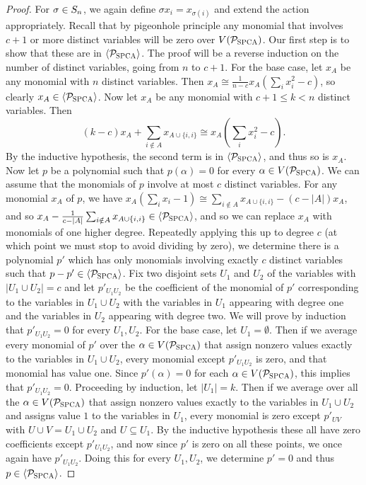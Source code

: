 \begin{proof}
For $\sigma \in S_{n}$, we again define $\sigma x_i = x_{\sigma(i)}$ and extend the action appropriately. Recall that by pigeonhole principle any monomial that involves $c+1$ or more distinct variables will be zero over $V(\mathcal P_{\textsc{SPCA}})$. Our first step is to show that these are in $\langle \mathcal P_{\textsc{SPCA}} \rangle$. The proof will be a reverse induction on the number of distinct variables, going from $n$ to $c+1$.  
For the base case, let $x_A$ be any monomial with $n$ distinct variables. Then $x_A \cong \frac{1}{n-c} x_A(\sum_i x_i^2 - c)$, so clearly $x_A \in \langle \mathcal P_{\textsc{SPCA}} \rangle$.
Now let $x_A$ be any monomial with $c+1 \leq k < n$ distinct variables. Then
\[\left(k-c\right)x_A + \sum_{i \notin A} x_{A \cup \{i,i\}} \cong x_A\left(\sum_i x^2_i - c\right).\]
By the inductive hypothesis, the second term is in $\langle \mathcal P_{\textsc{SPCA}} \rangle$, and thus so is $x_A$. 
Now let $p$ be a polynomial such that $p(\alpha) = 0$ for every $\alpha \in V(\mathcal P_{\textsc{SPCA}})$. 
We can assume that the monomials of $p$ involve at most $c$ distinct variables. For any monomial $x_A$ of $p$, we have $x_A(\sum_i x_i - 1) \cong \sum_{i \notin A} x_{A \cup \{i,i\}} - (c-|A|)x_A$, and so $x_A - \frac{1}{c - |A|}\sum_{i \notin A} x_{A \cup \{i,i\}} \in \langle \mathcal P_{\textsc{SPCA}} \rangle$, and so we can replace $x_A$ with monomials of one higher degree. Repeatedly applying this up to degree $c$ (at which point we must stop to avoid dividing by zero), we determine there is a polynomial $p'$ which has only monomials involving exactly $c$ distinct variables such that $p - p' \in \langle \mathcal P_{\textsc{SPCA}} \rangle$. Fix two disjoint sets $U_1$ and $U_2$ of the variables with $|U_1 \cup U_2| = c$ and let $p'_{U_1U_2}$ be the coefficient of the monomial of $p'$ corresponding to the variables in $U_1 \cup U_2$ with the variables in $U_1$ appearing with degree one and the variables in $U_2$ appearing with degree two. We will prove by induction that $p'_{U_1U_2} = 0$ for every $U_1,U_2$. For the base case, let $U_1 = \emptyset$. Then if we average every monomial of $p'$ over the $\alpha \in V(\mathcal P_{\textsc{SPCA}})$ that assign nonzero values exactly to the variables in $U_1 \cup U_2$, every monomial except $p'_{U_1U_2}$ is zero, and that monomial has value one. Since $p'(\alpha) = 0$ for each $\alpha \in V(\mathcal P_{\textsc{SPCA}})$, this implies that $p'_{U_1U_2} = 0$. Proceeding by induction, let $|U_1| = k$. Then if we average over all the $\alpha \in V(\mathcal P_{\textsc{SPCA}})$ that assign nonzero values exactly to the variables in $U_1 \cup U_2$ and assigns value $1$ to the variables in $U_1$, every monomial is zero except $p'_{UV}$ with $U \cup V = U_1 \cup U_2$ and $U \subseteq U_1$. By the inductive hypothesis these all have zero coefficients except $p'_{U_1U_2}$, and now since $p'$ is zero on all these points, we once again have $p'_{U_1U_2}$. Doing this for every $U_1,U_2$, we determine $p' = 0$ and thus $p \in \langle \mathcal P_{\textsc{SPCA}} \rangle$. 
\end{proof}


